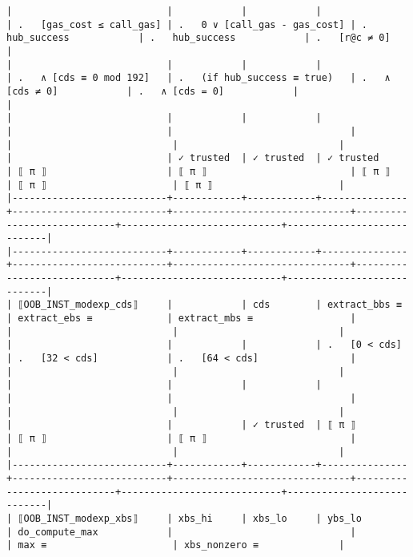 \documentclass[varwidth=\maxdimen,margin=0.5cm,multi={verbatim}]{standalone}
\begin{document}
\begin{verbatim}
|                           |            |            |               | .   [gas_cost ≤ call_gas] | .   0 ∨ [call_gas - gas_cost] | .   hub_success            | .   hub_success            | .   [r@c ≠ 0]              |
|                           |            |            |               | .   ∧ [cds ≡ 0 mod 192]   | .   (if hub_success ≡ true)   | .   ∧ [cds ≠ 0]            | .   ∧ [cds = 0]            |                            |
|                           |            |            |               |                           |                               |                            |                            |                            |
|                           | ✓ trusted  | ✓ trusted  | ✓ trusted     | ⟦ π ⟧                     | ⟦ π ⟧                         | ⟦ π ⟧                      | ⟦ π ⟧                      | ⟦ π ⟧                      |
|---------------------------+------------+------------+---------------+---------------------------+-------------------------------+----------------------------+----------------------------+----------------------------|
|---------------------------+------------+------------+---------------+---------------------------+-------------------------------+----------------------------+----------------------------+----------------------------|
| ⟦OOB_INST_modexp_cds⟧     |            | cds        | extract_bbs ≡ | extract_ebs ≡             | extract_mbs ≡                 |                            |                            |                            |
|                           |            |            | .   [0 < cds] | .   [32 < cds]            | .   [64 < cds]                |                            |                            |                            |
|                           |            |            |               |                           |                               |                            |                            |                            |
|                           |            | ✓ trusted  | ⟦ π ⟧         | ⟦ π ⟧                     | ⟦ π ⟧                         |                            |                            |                            |
|---------------------------+------------+------------+---------------+---------------------------+-------------------------------+----------------------------+----------------------------+----------------------------|
| ⟦OOB_INST_modexp_xbs⟧     | xbs_hi     | xbs_lo     | ybs_lo        | do_compute_max            |                               |                            | max ≡                      | xbs_nonzero ≡              |

\end{verbatim}
\end{document}
